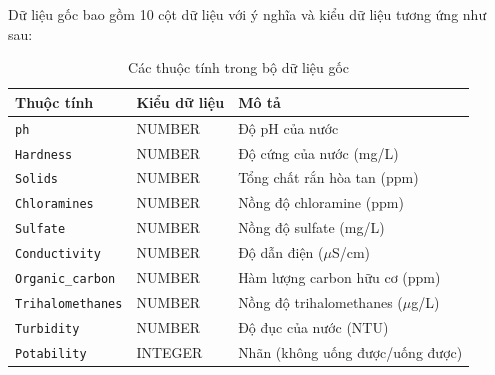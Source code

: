 \hspace{17pt}Dữ liệu gốc bao gồm 10 cột dữ liệu với ý nghĩa và kiểu dữ liệu tương ứng như sau:

\begin{table}[H]
\centering
\caption{Các thuộc tính trong bộ dữ liệu gốc}
\label{tab:source_fields}
\begin{tabular}{llp{7cm}} %
\toprule %
\textbf{Thuộc tính} & \textbf{Kiểu dữ liệu} & \textbf{Mô tả} \\
\midrule %
\texttt{ph} & NUMBER & Độ pH của nước \\
\texttt{Hardness} & NUMBER & Độ cứng của nước (mg/L) \\
\texttt{Solids} & NUMBER & Tổng chất rắn hòa tan (ppm) \\
\texttt{Chloramines} & NUMBER & Nồng độ chloramine (ppm) \\
\texttt{Sulfate} & NUMBER & Nồng độ sulfate (mg/L) \\
\texttt{Conductivity} & NUMBER & Độ dẫn điện ($\mu$S/cm) \\
\texttt{Organic\_carbon} & NUMBER & Hàm lượng carbon hữu cơ (ppm) \\
\texttt{Trihalomethanes} & NUMBER & Nồng độ trihalomethanes ($\mu$g/L) \\
\texttt{Turbidity} & NUMBER & Độ đục của nước (NTU) \\
\texttt{Potability} & INTEGER & Nhãn (không uống được/uống được) \\
\bottomrule %
\end{tabular}
\end{table}
